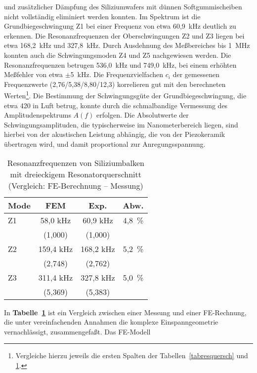 und zusätzlicher Dämpfung des Siliziumwafers mit dünnen Softgummischeiben
nicht vollständig eliminiert werden konnten. Im Spektrum ist
die Grundbiegeschwingung Z1 bei einer Frequenz von etwa 60,9~kHz deutlich
zu erkennen. Die Resonanzfrequenzen der Oberschwingungen Z2 und Z3 liegen
bei etwa 168,2~kHz und 327,8~kHz. Durch Ausdehnung des Meßbereiches bis 1~MHz
konnten auch die Schwingungsmoden Z4 und Z5 nachgewiesen werden. Die
Resonanzfrequenzen betrugen 536,0~kHz und 749,0~kHz, bei einem erhöhten
Meßfehler von etwa $\pm$5~kHz. Die Frequenzvielfachen $c_{i}$ der
gemessenen Frequenzwerte (2,76/5,38/8,80/12,3) korrelieren gut mit den
berechneten Werten\footnote{Vergleiche hierzu jeweils die ersten Spalten der
Tabellen~\ref{tabresquersch} und \ref{tabquerschfreq}.}. Die Bestimmung der
Schwingungsgüte der Grundbiegeschwingung, die etwa 420 in Luft betrug,
konnte durch die schmalbandige Vermessung des Amplitudenspektrums $A(f)$
erfolgen. Die Absolutwerte der Schwingungsamplituden, die
typischerweise im Nanometerbereich liegen, sind hierbei von der
akustischen Leistung abhängig, die von der Piezokeramik übertragen wird,
und damit proportional zur Anregungsspannung.\\
\begin{table}[htb]
\caption{\label{tabquerschfreq}
 Resonanzfrequenzen von Siliziumbalken mit dreieckigem Resonatorquerschnitt
 (Vergleich: FE-Berechnung -- Messung)}
\begin{center}
\begin{tabular} {|l||c|c|c|}
\hline
 Mode  & FEM  & Exp. & Abw. \\
\hline \hline
 Z1 &  58,0  kHz  &   60,9 kHz & 4,8~\% \\
    & (1,000)     &  (1,000)   &        \\
\hline
 Z2 &  159,4 kHz  &  168,2 kHz & 5,2~\% \\
    & (2,748)     &  (2,762)   &        \\
\hline
 Z3 &  311,4 kHz  & 327,8 kHz  & 5,0~\% \\
    & (5,369)     & (5,383)    &        \\
\hline
\end{tabular}
\end{center}
\end{table}
In {\bf Tabelle~\ref{tabquerschfreq}} ist ein Vergleich zwischen einer
Messung und einer FE-Rechnung, die unter vereinfachenden Annahmen die
komplexe Einspanngeometrie vernachlässigt, zusammengefaßt. Das FE-Modell
